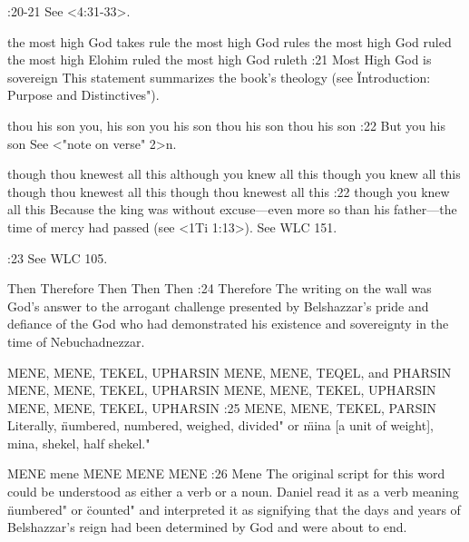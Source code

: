 :20-21 {}  See <4:31-33>.

    {the most high God takes rule} %
    {the most high God rules} %
    {the most high God ruled} %
    {the most high Elohim ruled} %
    {the most high God ruleth} %
:21 {Most High God is sovereign} This statement summarizes 
the book's theology (see \"Introduction: Purpose and Distinctives").

    {thou his son} %
    {you, his son} %
    {you his son} %
    {thou his son} %
    {thou his son} %
:22 {But you his son} See <"note on verse" 2>n.

    {though thou knewest all this} %
    {although you knew all this} %
    {though you knew all this} %
    {though thou knewest all this} %
    {though thou knewest all this} %
:22 {though you knew all this} Because the king was without excuse—even more so than his 
father—the time of mercy had passed (see <1Ti 1:13>). See WLC 151. 

:23 {}  See WLC 105.

    {Then} %
    {Therefore} %
    {Then} %
    {Then} %
    {Then} %
:24 {Therefore} The writing on the wall was God's answer to the 
arrogant challenge presented by Belshazzar's pride and defiance of 
the God who had demonstrated his existence and sovereignty in 
the time of Nebuchadnezzar.

    {MENE, MENE, TEKEL, UPHARSIN} %
    {MENE, MENE, TEQEL, and PHARSIN} %
    {MENE, MENE, TEKEL, UPHARSIN} %
    {MENE, MENE, TEKEL, UPHARSIN} %
    {MENE, MENE, TEKEL, UPHARSIN} %
:25 {MENE, MENE, TEKEL, PARSIN} Literally, \"numbered, numbered, 
weighed, divided" or \"mina [a unit of weight], mina, shekel, half 
shekel."

    {MENE} %
    {mene} %
    {MENE} %
    {MENE} %
    {MENE} %
:26 {Mene} %
The original script for this word 
could be understood as either a verb or a noun. Daniel read it as a 
verb meaning \"numbered" or \"counted" and interpreted it as signifying that the days and years of Belshazzar's reign had been determined by God and were about to end.

